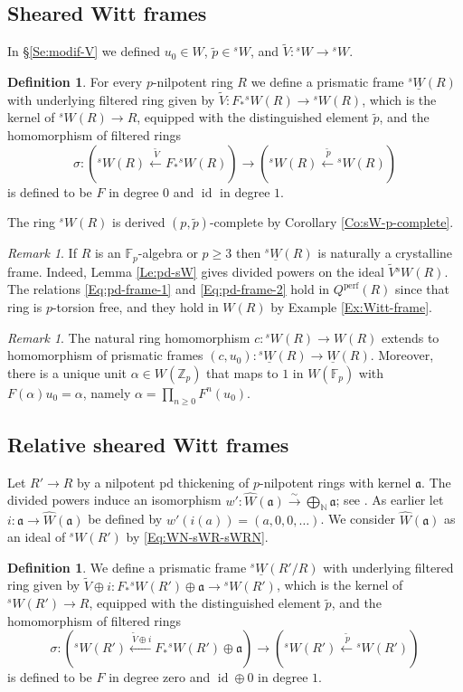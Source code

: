 \documentclass[a4paper,11pt]{amsart}
\theoremstyle{plain}
\theoremstyle{definition}
\newtheorem{Defn}[equation]{Definition}
\theoremstyle{remark}
\newtheorem{Remark}[equation]{Remark}
\newcommand{\bDe}{\begin{Defn}}
\newcommand{\eDe}{\end{Defn}}
\newcommand{\bRe}{\begin{Remark}}
\newcommand{\eRe}{\end{Remark}}
\renewcommand{\u}{\underline}
\numberwithin{equation}{section}
\newcommand{\Fa}{\mathfrak{a}}
\newcommand{\FF}{{\mathbb{F}}}
\newcommand{\NN}{{\mathbb{N}}}
\newcommand{\ZZ}{{\mathbb{Z}}}
\DeclareMathOperator{\id}{id}
\DeclareMathOperator{\perf}{perf}
\newcommand{\limperf}{^{\perf}}
\newcommand{\sW}{{}^sW}
\newcommand{\usW}{{}^s\u W}
\begin{document}
\subsection{Sheared Witt frames}

In \S\ref{Se:modif-V} we defined $u_0\in W$, $\tilde p\in\sW$, and $\tilde V\colon\sW\to\sW$.

\bDe
For every $p$-nilpotent ring $R$ we define a prismatic frame $\usW(R)$ with underlying  
filtered ring given by $\tilde V\colon F_*\sW(R)\to\sW(R)$, which is the kernel of $\sW(R)\to R$, equipped with the distinguished element $\tilde p$,
and the homomorphism of filtered rings
\[
\sigma\colon (\sW(R)\xleftarrow{\:\tilde V}F_*\sW(R))\longrightarrow(\sW(R)\xleftarrow{\: \tilde p}\sW(R))
\]
is defined to be $F$ in degree $0$ and $\id$ in degree $1$. 

The ring $\sW(R)$ is derived $(p,\tilde p)$-complete by Corollary \ref{Co:sW-p-complete}.
\eDe

\bRe
\label{Re:usW-pd-frame}
If $R$ is an $\FF_p$-algebra or $p\ge 3$ then $\usW(R)$ 
is naturally a crystalline frame. Indeed, Lemma \ref{Le:pd-sW} gives divided powers on the ideal $\tilde V\sW(R)$. The relations \eqref{Eq:pd-frame-1} and \eqref{Eq:pd-frame-2} hold in $Q\limperf(R)$ since that ring is $p$-torsion free, and they hold in $W(R)$ by Example \ref{Ex:Witt-frame}.
\eRe

\bRe
\label{Re:Hom-usW-uW}
The natural ring homomorphism $c\colon\sW(R)\to W(R)$ extends to homomorphism of prismatic frames $(c,u_0)\colon\usW(R)\to\u W(R)$. Moreover, there is a unique unit $\alpha\in W(\ZZ_p)$ that maps to $1$ in $W(\FF_p)$ with $F(\alpha) u_0=\alpha$, namely $\alpha=\prod_{n\ge 0}F^n(u_0)$.
\eRe

\subsection{Relative sheared Witt frames}

Let $R'\to R$ by a nilpotent pd thickening of $p$-nilpotent rings with kernel $\Fa$. The divided powers induce an isomorphism $w':\hat W(\Fa)\xrightarrow\sim\bigoplus_{\NN}\Fa$; see \cite[(149)]{Zink:The-display}. As  earlier let $i:\Fa\to\hat W(\Fa)$ be defined by $w'(i(a))=(a,0,0,\ldots)$. 
We consider $\hat W(\Fa)$ as an ideal of $\sW(R')$ by \eqref{Eq:WN-sWR-sWRN}.

\bDe
We define a prismatic frame $\usW(R'/R)$ with underlying 
filtered ring given by $\tilde V\oplus i\colon F_*\sW(R')\oplus\Fa\to\sW(R')$, which is the kernel of $\sW(R')\to R$, equipped with the distinguished element $\tilde p$, 
and the homomorphism of filtered rings
\[
\sigma\colon (\sW(R')\xleftarrow{\:\tilde V\oplus i}F_*\sW(R')\oplus \Fa)\longrightarrow(\sW(R')\xleftarrow{\: \tilde p} \sW(R'))
\]
is defined to be $F$ in degree zero and ${\id}\oplus 0$ in degree $1$.
\eDe
\end{document}
